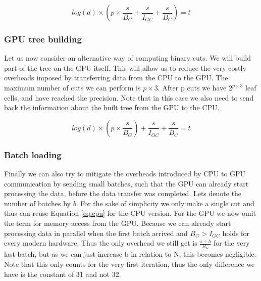 \documentclass[]{article}
\begin{document}
\begin{center}
	\begin{equation}
			log(d) \times \left ( p \times \frac{s}{B_{G}} + \frac{s}{I_{GC}}  + \frac{s}{B_{C}} \right ) = t
		\label{eq:gpu}
	\end{equation}
\end{center}

\vspace{5mm}


\subsubsection{GPU tree building}\label{gpu-tree-building}

Let us now consider an alternative way of computing binary cuts. We will build part of the tree on the GPU itself. This will allow us to reduce the very costly overheads imposed by transferring data from the CPU to the GPU. The maximum number of cuts we can perform is $p \times 3$. After p cuts we have $2^{p \times 3}$ leaf cells, and have reached the precision. Note that in this case we also need to send back the information about the built tree from the GPU to the CPU. 

\begin{center}
	\begin{equation}
		log(d) \times \left ( p \times \frac{s}{B_{G}} \right ) + \frac{s}{I_{GC}} + \frac{s}{B_{C}} = t
		\label{eq:gputree}
	\end{equation}
\end{center}


\subsubsection{Batch loading}

Finally we can also try to mitigate the overheads introduced by CPU to GPU communication by sending small batches, such that the GPU can already start processing the data, before the data transfer was completed. Lets denote the number of batches by $b$. For the sake of simplicity we only make a single cut and thus can reuse Equation \ref{eq:cpu} for the CPU version. For the GPU we now omit the term for memory access from the GPU. Because we can already start processing data in parallel when the first batch arrived and $B_{G} > I_{GC}$ holds for every modern hardware. Thus the only overhead we still get is $\frac{s \div b}{B_{G}}$ for the very last batch, but as we can just increase b in relation to N, this becomes negligible. Note that this only counts for the very first iteration, thus the only difference we have is the constant of 31 and not 32. 
\end{document}
